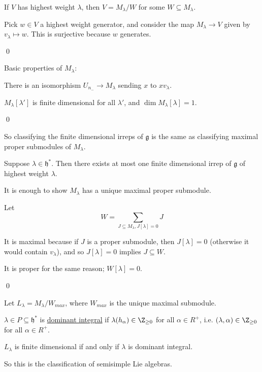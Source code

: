 \documentclass[x11names,reqno,14pt]{extarticle}
\newcommand{\mk}[1]{\mathfrak{#1}}
\newcommand{\g}{\mk{g}}
\newcommand{\h}{\mk{h}}
\begin{document}
\prop

If $V$ has highest weight $\lambda$, then $V = M_\lambda / W$ for some $W\subseteq M_\lambda$.

\proof

Pick $w \in V$ a highest weight generator, and consider the map $M_\lambda\to V$ given by $v_\lambda\mapsto w$. This is surjective because $w$ generates. 

\qed

Basic properties of $M_\lambda:$

There is an isomorphism $U_{n_-}\to M_\lambda$ sending $x$ to $xv_\lambda$. 

\cor

$M_\lambda[\lambda']$ is finite dimensional for all $\lambda'$, and $\dim M_\lambda[\lambda]=1$. 

\proof

\qed

So classifying the finite dimensional irreps of $\g$ is the same as classifying maximal proper submodules of $M_\lambda$. 

\thm

Suppose $\lambda \in \h^*$. Then there exists at most one finite dimensional irrep of $\g$ of highest weight $\lambda$. 

\proof

It is enough to show $M_\lambda$ has a unique maximal proper submodule. 

Let 
\[
W = \sum_{J\subseteq M_\lambda, J[\lambda] = 0}J
\]

It is maximal because if $J$ is a proper submodule, then $J[\lambda]=0$ (otherwise it would contain $v_\lambda$), and so $J[\lambda]=0$ implies $J\subseteq W$. 

It is proper for the same reason; $W[\lambda]=0$.

\qed


Let $L_\lambda = M_\lambda / W_{max}$, where $W_{max}$ is the unique maximal submodule. 


$\lambda \in P \subseteq \h^*$ is \underline{dominant integral} if $\lambda(h_\alpha) \in \Z_{\geq0}$ for all $\alpha \in R^+$, i.e. $(\lambda,\alpha) \in \Z_{\geq0}$ for all $\alpha \in R^+$. 

\thm

$L_\lambda$ is finite dimensional if and only if $\lambda$ is dominant integral. 

So this is the classification of semisimple Lie algebras. 
\end{document}
